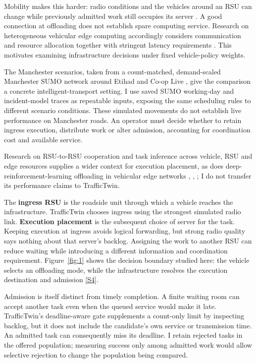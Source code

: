 \documentclass[12pt,a4paper]{article}
\begin{document}
Mobility makes this harder: radio conditions and the vehicles around an RSU can change while previously admitted work still occupies its server \cite{ref5}. A good connection at offloading does not establish spare computing service. Research on heterogeneous vehicular edge computing accordingly considers communication and resource allocation together with stringent latency requirements \cite{ref6}. This motivates examining infrastructure decisions under fixed vehicle-policy weights.

The Manchester scenarios, taken from a count-matched, demand-scaled Manchester SUMO network around Etihad and Co-op Live \cite{ref47}, give the comparison a concrete intelligent-transport setting. I use saved SUMO working-day and incident-model traces as repeatable inputs, exposing the same scheduling rules to different scenario conditions. These simulated movements do not establish live performance on Manchester roads. An operator must decide whether to retain ingress execution, distribute work or alter admission, accounting for coordination cost and available service.

Research on RSU-to-RSU cooperation \cite{ref7} and task inference across vehicle, RSU and edge resources \cite{ref8} supplies a wider context for execution placement, as does deep-reinforcement-learning offloading in vehicular edge networks \cite{ref9}, \cite{ref10}, \cite{ref11}; I do not transfer its performance claims to TrafficTwin.

The \textbf{ingress RSU} is the roadside unit through which a vehicle reaches the infrastructure. TrafficTwin chooses ingress using the strongest simulated radio link. \textbf{Execution placement} is the subsequent choice of server for the task. Keeping execution at ingress avoids logical forwarding, but strong radio quality says nothing about that server's backlog. Assigning the work to another RSU can reduce waiting while introducing a different information and coordination requirement. Figure~\ref{fig:1} shows the decision boundary studied here: the vehicle selects an offloading mode, while the infrastructure resolves the execution destination and admission \hyperref[source-s4]{[S4]}.

Admission is itself distinct from timely completion. A finite waiting room can accept another task even when the queued service would make it late. TrafficTwin's deadline-aware gate supplements a count-only limit by inspecting backlog, but it does not include the candidate's own service or transmission time. An admitted task can consequently miss its deadline. I retain rejected tasks in the offered population; measuring success only among admitted work would allow selective rejection to change the population being compared.
\end{document}
